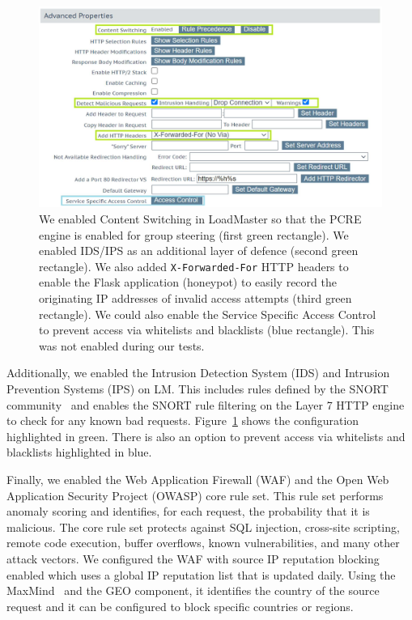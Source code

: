\begin{figure}
  \centerline{\includegraphics[width=\textwidth]{img/loadmaster-ids-ips}}
  \caption{We enabled Content Switching in LoadMaster so that the PCRE
    engine is enabled for group steering (first green rectangle).  We
    enabled IDS/IPS as an additional layer of defence (second green
    rectangle).  We also added \texttt{X-Forwarded-For} HTTP headers
    to enable the Flask application (honeypot) to easily record the
    originating IP addresses of invalid access attempts (third green
    rectangle).  We could also enable the Service Specific Access
    Control to prevent access via whitelists and blacklists (blue
    rectangle).  This was not enabled during our
    tests.}\label{fig:loadmaster-ids-ips}
\end{figure}

Additionally, we enabled the Intrusion Detection System (IDS) and
Intrusion Prevention Systems (IPS) on LM.  This includes rules defined
by the SNORT community~\cite{cisco-snort-xx} and enables the SNORT
rule filtering on the Layer 7 HTTP engine to check for any known bad
requests.  Figure~\ref{fig:loadmaster-ids-ips} shows the configuration
highlighted in green.  There is also an option to prevent access via
whitelists and blacklists highlighted in blue.

Finally, we enabled the Web Application Firewall (WAF) and the Open
Web Application Security Project (OWASP) core rule set.  This rule set
performs anomaly scoring and identifies, for each request, the
probability that it is malicious.  The core rule set protects against
SQL injection, cross-site scripting, remote code execution, buffer
overflows, known vulnerabilities, and many other attack vectors.  We
configured the WAF with source IP reputation blocking enabled which
uses a global IP reputation list that is updated daily. Using the
MaxMind~\cite{maxmind-xx} and the GEO component, it identifies the
country of the source request and it can be configured to block
specific countries or regions.

